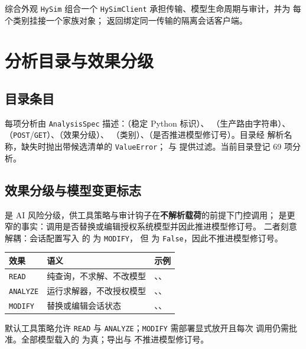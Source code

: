 \documentclass[UTF8,fontset=fandol,a4paper,11pt]{ctexart}
\begin{document}
综合外观 \texttt{HySim} 组合一个 \texttt{HySimClient} 承担传输、模型生命周期与审计，并为
每个类别挂接一个家族对象； 返回绑定同一传输的隔离会话客户端。

\section{分析目录与效果分级}
\subsection{目录条目}
每项分析由 \texttt{AnalysisSpec} 描述：（稳定 Python 标识）、
（生产路由字符串）、（\texttt{POST}/\texttt{GET}）、（效果分级）、
（类别）、（是否推进模型修订号）。目录经
 解析名称，缺失时抛出带候选清单的 \texttt{ValueError}；
 与  提供过滤。当前目录登记 69 项分析。

\subsection{效果分级与模型变更标志}
 是 AI 风险分级，供工具策略与审计钩子在\textbf{不解析载荷}的前提下门控调用；
 是更窄的事实：调用是否替换或编辑授权系统模型并因此推进模型修订号。
二者刻意解耦：会话配置写入  的  为 \texttt{MODIFY}，
但  为 \texttt{False}，因此不推进模型修订号。

\begin{center}\footnotesize
\begin{tabular}{@{}L{2.6cm}L{3.0cm}L{7.6cm}@{}}
\toprule
\textbf{效果} & \textbf{语义} & \textbf{示例} \\
\midrule
\texttt{READ} & 纯查询，不求解、不改模型 & 、、 \\
\texttt{ANALYZE} & 运行求解器，不改授权模型 & 、、 \\
\texttt{MODIFY} & 替换或编辑会话状态 & 、、 \\
\bottomrule
\end{tabular}
\end{center}

默认工具策略允许 \texttt{READ} 与 \texttt{ANALYZE}；\texttt{MODIFY} 需部署显式放开且每次
调用仍需批准。全部模型载入的  为真；导出与 
不推进模型修订号。
\end{document}
